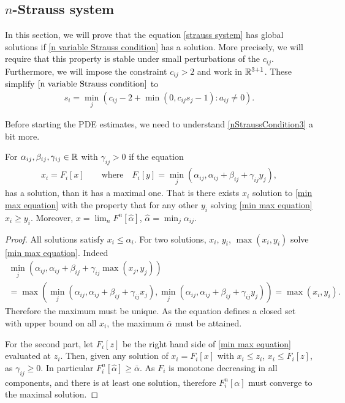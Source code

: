 \documentclass[11pt, oneside]{amsart}
\begin{document}
	
	
	\subsection{$n$-Strauss system}
 	In this section, we will prove that the equation \cref{strauss system} has global solutions if \cref{n variable Strauss condition} has a solution. More precisely, we will require that this property is stable under small perturbations of the $c_{ij}$. Furthermore, we will impose the constraint $c_{ij}>2$ and work in $\mathbb{R}^{3+1}$. These simplify $\cref{n variable Strauss condition}$ to 
 	\begin{equation}\label{nStraussCondition3}
 		\begin{gathered}
 			s_i=\min_j(c_{ij}-2+\min(0,c_{ij}s_j-1):a_{ij}\neq 0).
 		\end{gathered}
 	\end{equation}
 
 Before starting the PDE estimates, we need to understand \cref{nStraussCondition3} a bit more. 
 
 \begin{lemma}\label{minmax convergence}
 	For $\alpha_{ij},\beta_{ij},\gamma_{ij}\in\mathbb{R}$ with $\gamma_{ij}>0$ if the equation
 	\begin{equation}\label{min max equation}
 		\begin{gathered}
 			x_{i}=F_i[x] \qquad\text{where} \quad 	F_i[y]=\min_j(\alpha_{ij},\alpha_{ij}+\beta_{ij}+\gamma_{ij}y_j),
 		\end{gathered}
 	\end{equation}
 	has a solution, than it has a maximal one. That is there exists $x_i$ solution to \cref{min max equation} with the property that for any other $y_i$ solving \cref{min max equation} $x_i\geq y_i$. Moreover,  $x=\lim_nF^n[\hat{\alpha}]$, $\hat{\alpha}=\min_j{\alpha_{ij}}$.
 \end{lemma}
 \begin{proof}
 	All solutions satisfy $x_i\leq \alpha_i$. For two solutions, $x_i,\,y_i$, $\max(x_i,y_i)$ solve \cref{min max equation}. Indeed
 	\begin{equation*}
 		\begin{gathered}
 			\min_j(\alpha_{ij},\alpha_{ij}+\beta_{ij}+\gamma_{ij}\max(x_j,y_j))\\
 			=\max(\min_j(\alpha_{ij},\alpha_{ij}+\beta_{ij}+\gamma_{ij}x_j),\min_j(\alpha_{ij},\alpha_{ij}+\beta_{ij}+\gamma_{ij}y_j))=\max(x_i,y_i).
 		\end{gathered}
 	\end{equation*}
 	Therefore the maximum must be unique. As the equation defines a closed set with upper bound on all $x_i$, the maximum $\bar{\alpha}$ must be attained.
 	
 	For the second part, let $F_i[z]$ be the right hand side of \cref{min max equation} evaluated at $z_i$. Then, given any solution of $x_i=F_i[x]$ with $x_i\leq z_i$, $x_i\leq F_i[z]$, as $\gamma_{ij}\geq0$. In particular $F_i^n[\hat{\alpha}]\geq \bar{\alpha}$. As $F_i$ is monotone decreasing in all components, and there is at least one solution, therefore $F_i^n[\alpha]$ must converge to the maximal solution.
 \end{proof}
 
\end{document}
